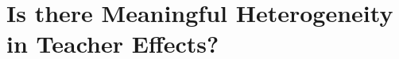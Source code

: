 \documentclass[t,aspectratio=169,11pt]{beamer}
\begin{document}


    








\section{Is there Meaningful Heterogeneity in Teacher Effects?}
\end{document}
